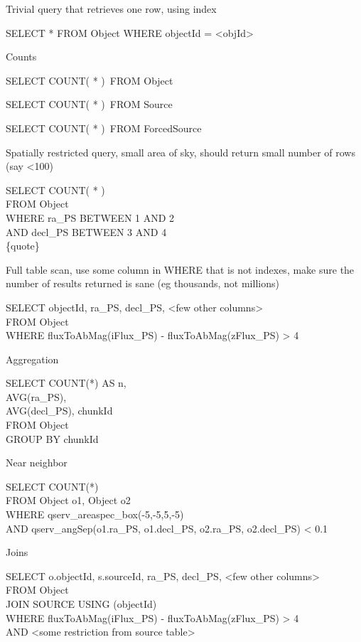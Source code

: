 \documentclass[DM,toc]{lsstdoc}
\begin{document}
Trivial query that retrieves one row, using index

SELECT * FROM Object WHERE objectId = \textless{}objId\textgreater{}

Counts

SELECT COUNT( * )~FROM Object

SELECT COUNT( * )~FROM Source

SELECT COUNT( * )~FROM ForcedSource

Spatially restricted query, small area of sky, should return small
number of rows (say \textless{}100)

SELECT COUNT( * )\\
FROM Object\\
WHERE ra\_PS BETWEEN 1 AND 2\\
AND decl\_PS BETWEEN 3 AND 4\\
\{quote\}

Full table scan, use some column in WHERE that is not indexes, make sure
the number of results returned is sane (eg thousands, not millions)

SELECT objectId, ra\_PS, decl\_PS, \textless{}few other
columns\textgreater{}\\
FROM Object\\
WHERE fluxToAbMag(iFlux\_PS) - fluxToAbMag(zFlux\_PS) \textgreater{} 4

Aggregation

SELECT COUNT(*) AS n,\\
AVG(ra\_PS),\\
AVG(decl\_PS), chunkId\\
FROM Object\\
GROUP BY chunkId

Near neighbor

SELECT COUNT(*)\\
FROM Object o1, Object o2\\
WHERE qserv\_areaspec\_box(-5,-5,5,-5)\\
AND qserv\_angSep(o1.ra\_PS, o1.decl\_PS, o2.ra\_PS, o2.decl\_PS)
\textless{} 0.1

Joins

SELECT o.objectId, s.sourceId, ra\_PS, decl\_PS, \textless{}few other
columns\textgreater{}\\
FROM Object\\
JOIN SOURCE USING (objectId)\\
WHERE fluxToAbMag(iFlux\_PS) - fluxToAbMag(zFlux\_PS) \textgreater{} 4\\
AND \textless{}some restriction from source table\textgreater{}~
\end{document}
